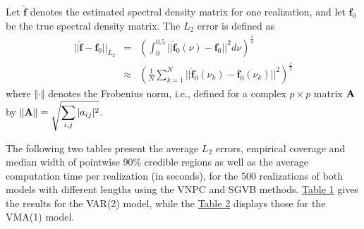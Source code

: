 \documentclass[%
 reprint,
 amsmath,amssymb,
 aps,
 nofootinbib,
]{revtex4-2}
\begin{document}
\label{appdx:simstudy}


Let $\hat{\bm{f}}$ denotes the estimated spectral density matrix for one realization, and let $\bm{f}_0$ be the true spectral density matrix. 
The $L_2$ error is defined as
\begin{eqnarray*}
||\hat{\bm{f}} - \bm{f}_0||_{L_2} &=& \left(\int_{0}^{0.5} ||\hat{\bm{f}}_0(\nu) - \bm{f}_0||^2 d\nu \right)^{\frac{1}{2}} \\
&\approx &\left(\frac{1}{N} \sum_{k=1}^{N}||\hat{\bm{f}}_0(\nu_k)-\bm{f}_0(\nu_k)||^2 \right)^{\frac{1}{2}}
\end{eqnarray*}
where $\Vert \cdot \Vert$ denotes the Frobenius norm, i.e., defined for a complex $p\times p$ matrix ${\bf A}$ by
$\displaystyle \Vert {\bf A}\Vert= \sqrt{\sum_{i,j} |a_{ij}|^2}$.

The following two tables present the average  $L_2$ errors, empirical coverage and median width of pointwise 90\% credible regions as well as the average computation time per realization (in seconds), for the 500 realizations of both models with different lengths using the VNPC and \ac{SGVB} methods. \hyperref[table l1l2 var2]{Table 1} gives the results for  the VAR(2) model, while the \hyperref[table l1l2 vma1]{Table 2} displays those for  the VMA(1) model.
\end{document}
